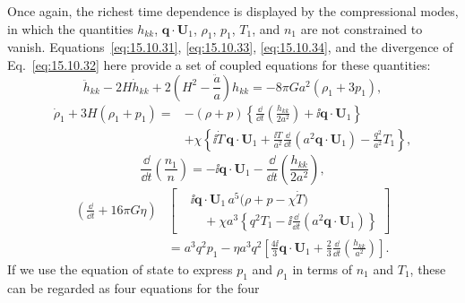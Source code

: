 Once again, the richest time dependence is displayed by the compressional
modes, in which the quantities \(h_{kk}\), \(\mathbf q\cdot\mathbf U_1\),
\(\rho_1\), \(p_1\), \(T_1\), and \(n_1\) are not constrained to vanish.
Equations~\eqref{eq:15.10.31}, \eqref{eq:15.10.33},
\eqref{eq:15.10.34}, and the divergence of Eq.~\eqref{eq:15.10.32} here
provide a set of coupled equations for these quantities:
\begin{equation}
  \ddot h_{kk}
  -2H\dot h_{kk}
  +2\left(H^2-\frac{\ddot a}{a}\right)h_{kk}
  =
  -8\pi Ga^2(\rho_1+3p_1),
  \tag{15.10.50}\label{eq:15.10.50}
\end{equation}
\begin{equation}
  \begin{split}
  \dot\rho_1+3H(\rho_1+p_1)
  ={}&
  -(\rho+p)
  \left\{
    \frac{\dd}{\dd t}\left(\frac{h_{kk}}{2a^2}\right)
    +\ii\mathbf q\cdot\mathbf U_1
  \right\}\\
  &+\chi
  \left\{
    \ii\dot T\,\mathbf q\cdot\mathbf U_1
    +\frac{\ii T}{a^2}\frac{\dd}{\dd t}
      \left(a^2\mathbf q\cdot\mathbf U_1\right)
    -\frac{q^2}{a^2}T_1
  \right\},
  \end{split}
  \tag{15.10.51}\label{eq:15.10.51}
\end{equation}
\begin{equation}
  \frac{\dd}{\dd t}\left(\frac{n_1}{n}\right)
  =
  -\ii\mathbf q\cdot\mathbf U_1
  -\frac{\dd}{\dd t}\left(\frac{h_{kk}}{2a^2}\right),
  \tag{15.10.52}\label{eq:15.10.52}
\end{equation}
\begin{equation}
  \begin{aligned}
  \left(\frac{\dd}{\dd t}+16\pi G\eta\right)
  &\left[
    \begin{aligned}
      &\ii\mathbf q\cdot\mathbf U_1\,
        a^5\bigl(\rho+p-\chi\dot T\bigr)\\[-0.2em]
      &\quad+\chi a^3
      \left\{
        q^2T_1
        -\ii\frac{\dd}{\dd t}
          \left(a^2\mathbf q\cdot\mathbf U_1\right)
      \right\}
    \end{aligned}
  \right]\\
  &=
  a^3q^2p_1
  -\eta a^3q^2
  \left[
    \frac{4\ii}{3}\mathbf q\cdot\mathbf U_1
    +\frac23\frac{\dd}{\dd t}
      \left(\frac{h_{kk}}{a^2}\right)
  \right].
  \end{aligned}
  \tag{15.10.53}\label{eq:15.10.53}
\end{equation}
If we use the equation of state to express \(p_1\) and \(\rho_1\) in terms
of \(n_1\) and \(T_1\), these can be regarded as four equations for the four
